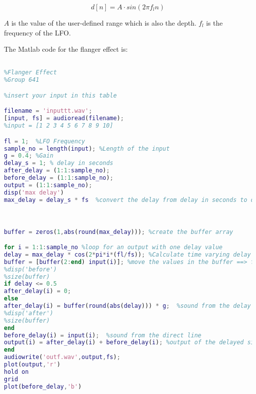 \begin{equation}
	d[n]= A \cdot sin(2\pi f_{l} n)
\end{equation}

$A$ is the value of the user-defined range which is also the depth. $f_{l}$ is the frequency of the LFO. 

The Matlab code for the flanger effect is:

\begin{lstlisting}[language=Matlab, caption= Matlab code for flanger effect]

%Flanger Effect
%Group 641

%insert your input in this table

filename = 'inputtt.wav';
[input, fs] = audioread(filename);
%input = [1 2 3 4 5 6 7 8 9 10]

fl = 1;  %LFO Frequency
sample_no = length(input); %Length of the input
g = 0.4; %Gain
delay_s = 1; % delay in seconds 
after_delay = (1:1:sample_no); 
before_delay = (1:1:sample_no);
output = (1:1:sample_no);
disp('max delay')
max_delay = delay_s * fs  %convert the delay from delay in seconds to delay in samples



buffer = zeros(1,abs(round(max_delay))); %create the buffer array 

for i = 1:1:sample_no %loop for an output with one delay value
delay = max_delay * cos(2*pi*i*(fl/fs)); %Calculate time varying delay (unit is samples)
buffer = [buffer(2:end) input(i)]; %move the values in the buffer ==> first value overwritten, one new value added at the end
%disp('before')
%size(buffer)
if delay <= 0.5
after_delay(i) = 0;
else
after_delay(i) = buffer(round(abs(delay))) * g;  %sound from the delay line in the block diagram
%disp('after')
%size(buffer)
end
before_delay(i) = input(i);  %sound from the direct line
output(i) = after_delay(i) + before_delay(i); %output of the delayed signal 
end
audiowrite('outf.wav',output,fs);
plot(output,'r')
hold on
grid
plot(before_delay,'b')






\end{lstlisting}





